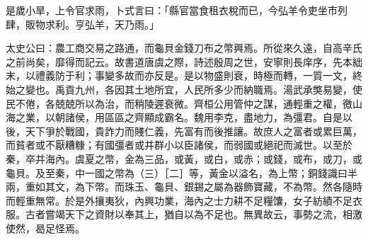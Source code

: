 \begin{pinyinscope}
是歲小旱，上令官求雨，卜式言曰：「縣官當食租衣稅而已，今弘羊令吏坐市列肆，販物求利。亨弘羊，天乃雨。」

太史公曰：農工商交易之路通，而龜貝金錢刀布之幣興焉。所從來久遠，自高辛氏之前尚矣，靡得而記云。故書道唐虞之際，詩述殷周之世，安寧則長庠序，先本絀末，以禮義防于利；事變多故而亦反是。是以物盛則衰，時極而轉，一質一文，終始之變也。禹貢九州，各因其土地所宜，人民所多少而納職焉。湯武承獘易變，使民不倦，各兢兢所以為治，而稍陵遲衰微。齊桓公用管仲之謀，通輕重之權，徼山海之業，以朝諸侯，用區區之齊顯成霸名。魏用李克，盡地力，為彊君。自是以後，天下爭於戰國，貴詐力而賤仁義，先富有而後推讓。故庶人之富者或累巨萬，而貧者或不厭糟糠；有國彊者或并群小以臣諸侯，而弱國或絕祀而滅世。以至於秦，卒并海內。虞夏之幣，金為三品，或黃，或白，或赤；或錢，或布，或刀，或龜貝。及至秦，中一國之幣為（三）［二］等，黃金以溢名，為上幣；銅錢識曰半兩，重如其文，為下幣。而珠玉、龜貝、銀錫之屬為器飾寶藏，不為幣。然各隨時而輕重無常。於是外攘夷狄，內興功業，海內之士力耕不足糧馕，女子紡績不足衣服。古者嘗竭天下之資財以奉其上，猶自以為不足也。無異故云，事勢之流，相激使然，曷足怪焉。


\end{pinyinscope}